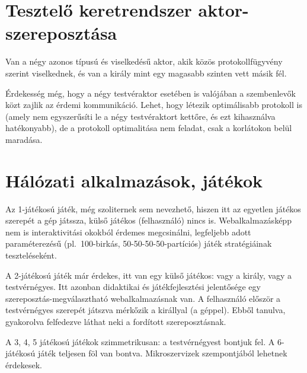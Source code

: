 \documentclass{article}
\begin{document}
\begin{comment}
	\subsection{Szabályok}

	\subsection{Rekurziós gráf}

	Szintezettség, hasonló a táblázathoz, de az indeterminisztikus komplementaritás miatt az élek kuszák a szintek között.

	\end{comment}

	\section{Tesztelő keretrendszer aktor-szereposztása}

	Van a négy azonos típusú és viselkedésű aktor, akik közös protokollfügyvény szerint viselkednek, és van a király mint egy magasabb szinten vett másik fél.

	Érdekesség még, hogy a négy testvéraktor esetében is valójában a szembenlevők közt zajlik az érdemi kommunikáció. Lehet, hogy létezik optimálisabb protokoll is (amely nem egyszerűsíti le a négy testvéraktort kettőre, és ezt kihasználva hatékonyabb), de a protokoll optimalitása nem feladat, csak a korlátokon belül maradása.

	\section{Hálózati alkalmazások, játékok}

	Az 1-játékosú játék, még szoliternek sem nevezhető, hiszen itt az egyetlen játékos szerepét a gép játssza, külső játékos (felhasználó) nincs is. Webalkalmazásképp nem is interaktivitási okokból érdemes megcsinálni, legfeljebb adott paraméterezésű (pl.~100-birkás, 50-50-50-50-partíciós) játék stratégiáinak teszteléseként.

	A 2-játékosú játék már érdekes, itt van egy külső játékos: vagy a király, vagy a testvérnégyes. Itt azonban didaktikai és játékfejlesztési jelentősége egy szereposztás-megválasztható webalkalmazásnak van. A felhasználó először a testvérnégyes szerepét játszva mérkőzik a királlyal (a géppel). Ebből tanulva, gyakorolva felfedezve láthat neki a fordított szereposztásnak.

	A 3, 4, 5 játékosú játékok szimmetrikusan: a testvérnégyest bontjuk fel. A 6-játékosú játék teljesen föl van bontva. Mikroszervizek szempontjából lehetnek érdekesek.
\end{document}
